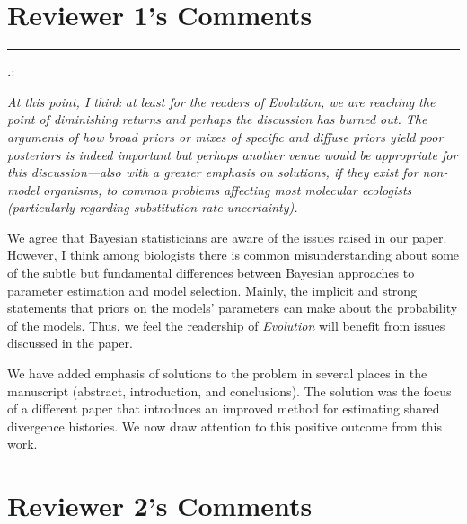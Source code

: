 \documentclass[12pt]{article}
\newcounter{commentCounter}
\newcommand{\revcomment}[1]{{\addtocounter{commentCounter}{1}}
    \medskip \hrule \noindent
\textbf{\arabic{section}.\arabic{commentCounter}}: {\sl #1}\par\xspace}
\newcommand{\response}[1]{{\addtolength{\leftskip}{0.25in} #1\par}\xspace}
\begin{document}
\section{Reviewer 1's Comments}\label{rev1}
\setcounter{commentCounter}{0}
\revcomment{
    At this point, I think at least for the readers of Evolution, we are
    reaching the point of diminishing returns and perhaps the discussion has
    burned out. The arguments of how broad priors or mixes of specific and
    diffuse priors yield poor posteriors is indeed important but perhaps
    another venue would be appropriate for this discussion---also with a
    greater emphasis on solutions, if they exist for non-model organisms, to
    common problems affecting most molecular ecologists (particularly regarding
    substitution rate uncertainty).
    
}
\response{
    We agree that Bayesian statisticians are aware of the issues raised in our
    paper. However, I think among biologists there is common misunderstanding
    about some of the subtle but fundamental differences between Bayesian
    approaches to parameter estimation and model selection. Mainly, the
    implicit and strong statements that priors on the models' parameters can
    make about the probability of the models. Thus, we feel the readership of
    \emph{Evolution} will benefit from issues discussed in the paper.

    We have added emphasis of solutions to the problem in several places in the
    manuscript (abstract, introduction, and conclusions). The solution was the
    focus of a different paper \citep{Oaks2014dpp} that introduces an improved
    method for estimating shared divergence histories. We now draw attention to
    this positive outcome from this work.
}


\section{Reviewer 2's Comments}\label{rev2}
\setcounter{commentCounter}{0}
\end{document}
